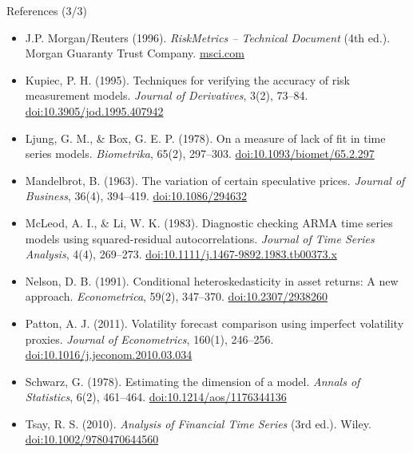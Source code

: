 \begin{frame}{References (3/3)}
\itemsize{\scriptsize}
\begin{itemize}
    \item J.P. Morgan/Reuters (1996). \textit{RiskMetrics -- Technical Document} (4th ed.). Morgan Guaranty Trust Company. \href{https://www.msci.com/documents/10199/5915b101-4206-4ba0-aee2-3449d5c7e95a}{msci.com}
    \item Kupiec, P. H. (1995). Techniques for verifying the accuracy of risk measurement models. \textit{Journal of Derivatives}, 3(2), 73--84. \href{https://doi.org/10.3905/jod.1995.407942}{doi:10.3905/jod.1995.407942}
    \item Ljung, G. M., \& Box, G. E. P. (1978). On a measure of lack of fit in time series models. \textit{Biometrika}, 65(2), 297--303. \href{https://doi.org/10.1093/biomet/65.2.297}{doi:10.1093/biomet/65.2.297}
    \item Mandelbrot, B. (1963). The variation of certain speculative prices. \textit{Journal of Business}, 36(4), 394--419. \href{https://doi.org/10.1086/294632}{doi:10.1086/294632}
    \item McLeod, A. I., \& Li, W. K. (1983). Diagnostic checking ARMA time series models using squared-residual autocorrelations. \textit{Journal of Time Series Analysis}, 4(4), 269--273. \href{https://doi.org/10.1111/j.1467-9892.1983.tb00373.x}{doi:10.1111/j.1467-9892.1983.tb00373.x}
    \item Nelson, D. B. (1991). Conditional heteroskedasticity in asset returns: A new approach. \textit{Econometrica}, 59(2), 347--370. \href{https://doi.org/10.2307/2938260}{doi:10.2307/2938260}
    \item Patton, A. J. (2011). Volatility forecast comparison using imperfect volatility proxies. \textit{Journal of Econometrics}, 160(1), 246--256. \href{https://doi.org/10.1016/j.jeconom.2010.03.034}{doi:10.1016/j.jeconom.2010.03.034}
    \item Schwarz, G. (1978). Estimating the dimension of a model. \textit{Annals of Statistics}, 6(2), 461--464. \href{https://doi.org/10.1214/aos/1176344136}{doi:10.1214/aos/1176344136}
    \item Tsay, R. S. (2010). \textit{Analysis of Financial Time Series} (3rd ed.). Wiley. \href{https://doi.org/10.1002/9780470644560}{doi:10.1002/9780470644560}
\end{itemize}
\end{frame}


